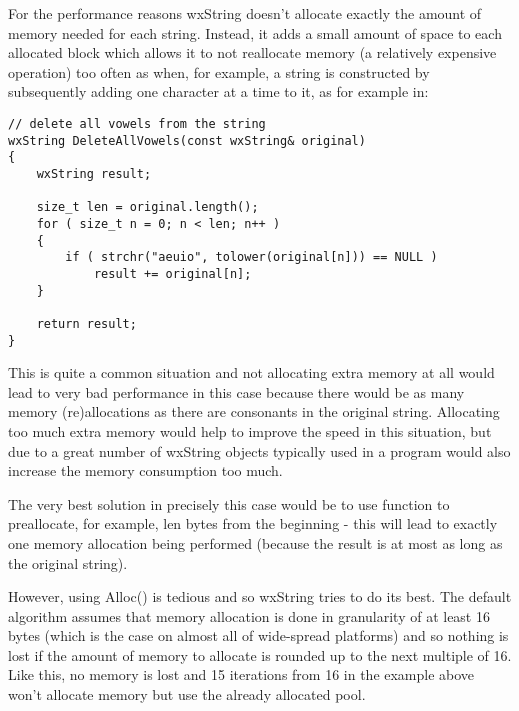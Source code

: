 For the performance reasons wxString doesn't allocate exactly the amount of
memory needed for each string. Instead, it adds a small amount of space to each
allocated block which allows it to not reallocate memory (a relatively
expensive operation) too often as when, for example, a string is constructed by
subsequently adding one character at a time to it, as for example in:

\begin{verbatim}
// delete all vowels from the string
wxString DeleteAllVowels(const wxString& original)
{
    wxString result;

    size_t len = original.length();
    for ( size_t n = 0; n < len; n++ )
    {
        if ( strchr("aeuio", tolower(original[n])) == NULL )
            result += original[n];
    }

    return result;
}
\end{verbatim}

This is quite a common situation and not allocating extra memory at all would
lead to very bad performance in this case because there would be as many memory
(re)allocations as there are consonants in the original string. Allocating too
much extra memory would help to improve the speed in this situation, but due to
a great number of wxString objects typically used in a program would also
increase the memory consumption too much.

The very best solution in precisely this case would be to use 
 function to preallocate, for example, len bytes
from the beginning - this will lead to exactly one memory allocation being
performed (because the result is at most as long as the original string).

However, using Alloc() is tedious and so wxString tries to do its best. The
default algorithm assumes that memory allocation is done in granularity of at
least 16 bytes (which is the case on almost all of wide-spread platforms) and so
nothing is lost if the amount of memory to allocate is rounded up to the next
multiple of 16. Like this, no memory is lost and 15 iterations from 16 in the
example above won't allocate memory but use the already allocated pool.

